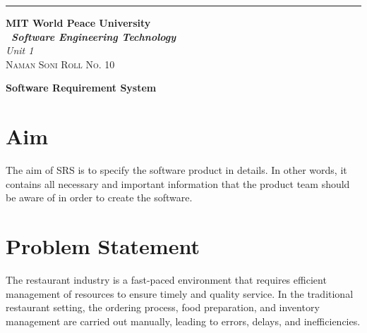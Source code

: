 \documentclass{article}
\begin{document}
\lstset{style=mystyle}
\begin{titlepage} %
	
	\raggedleft\rule{1pt}{\textheight} %
	\hspace{0.05\textwidth} %
	\parbox[b]{0.75\textwidth}
	{ %
		
		{\Huge\bfseries MIT World Peace University \\[0.5\baselineskip] \ \textit{Software Engineering Technology}}\\[2\baselineskip] %
		{\large\textit{Unit 1}}\\[4\baselineskip] %
		{\Large\textsc{Naman Soni Roll No. 10}} %
		
		\vspace{0.5\textheight} %
	}
	
\end{titlepage}
\tableofcontents
\pagebreak
\centerline{\Huge\bfseries Software Requirement System}
\section{Aim}
The aim of SRS is to specify the software product in details. In other words, it contains all necessary and important information that the product team should be aware of in order to create the software.
\section{Problem Statement}
The restaurant industry is a fast-paced environment that requires efficient management of resources to ensure timely and quality service. In the traditional restaurant setting, the ordering process, food preparation, and inventory management are carried out manually, leading to errors, delays, and inefficiencies.
\end{document}

